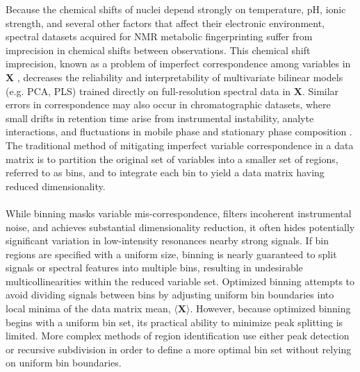 \begin{doublespace}
Because the chemical shifts of \hnmr{} nuclei depend strongly on temperature,
pH, ionic strength, and several other factors that affect their electronic
environment, spectral datasets acquired for NMR metabolic fingerprinting
suffer from imprecision in \hnmr{} chemical shifts between observations.
This chemical shift imprecision, known as a problem of imperfect correspondence
among variables in $\mathbf{X}$ \cite{aberg:abc2009}, decreases the reliability
and interpretability of multivariate bilinear models (e.g. PCA, PLS) trained
directly on full-resolution spectral data in $\mathbf{X}$. Similar errors in
correspondence may also occur in chromatographic datasets, where small drifts
in retention time arise from instrumental instability, analyte interactions,
and fluctuations in mobile phase and stationary phase composition
\cite{nielsen:jchrom1998}. The traditional method of mitigating imperfect
variable correspondence in a data matrix is to partition the original set
of variables into a smaller set of regions, referred to as bins, and
to integrate each bin to yield a data matrix having reduced dimensionality.
\\\\
While binning masks variable mis-correspondence, filters incoherent
instrumental noise, and achieves substantial dimensionality reduction, it often
hides potentially significant variation in low-intensity resonances nearby
strong signals. If bin regions are specified with a uniform size, binning is
nearly guaranteed to split signals or spectral features into multiple bins,
resulting in undesirable multicollinearities within the reduced variable set.
Optimized binning \cite{sousa:cils2013} attempts to avoid dividing signals
between bins by adjusting uniform bin boundaries into local minima of the
data matrix mean, $\langle\mathbf{X}\rangle$. However, because optimized
binning begins with a uniform bin set, its practical ability to minimize peak
splitting is limited. More complex methods of region identification use either
peak detection \cite{davis:cils2007} or recursive subdivision
\cite{demeyer:anchem2008} in order to define a more optimal bin set without
relying on uniform bin boundaries.
\end{doublespace}

